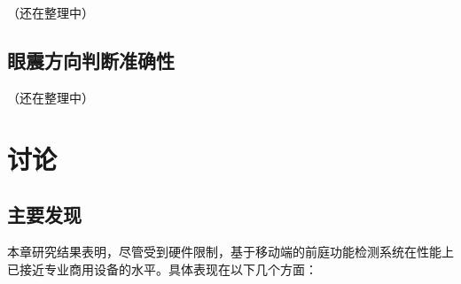 
（还在整理中）

\subsection{眼震方向判断准确性}




（还在整理中）

\section{讨论}

\subsection{主要发现}

本章研究结果表明，尽管受到硬件限制，基于移动端的前庭功能检测系统在性能上已接近专业商用设备的水平。具体表现在以下几个方面：

